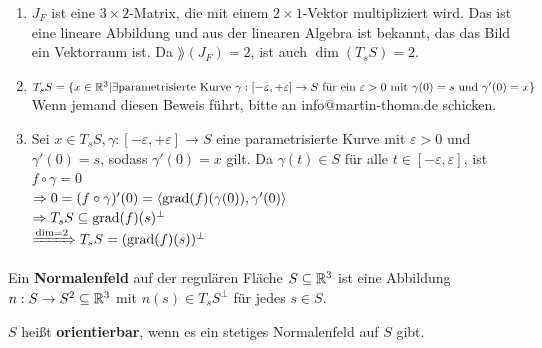 \begin{beweis}\leavevmode
    \begin{enumerate}[label=\alph*)]
        \item $J_F$ ist eine $3 \times 2$-Matrix, die mit einem $2 \times 1$-Vektor
              multipliziert wird. Das ist eine lineare Abbildung und aus der 
              linearen Algebra ist bekannt, das das Bild ein Vektorraum ist.
              Da $\rang(J_F) = 2$, ist auch $\dim (T_s S) = 2$.
        \item $T_s S = \{x \in \mathbb{R}^3 | \exists \text{parametrisierte Kurve } 
          \gamma:[- \varepsilon, + \varepsilon] \rightarrow S 
          \text{ für ein } \varepsilon > 0 
          \text{ mit } \gamma(0) = s \text{ und } \gamma'(0) = x
          \}$\\
          Wenn jemand diesen Beweis führt, bitte an info@martin-thoma.de 
          schicken.%
        \item Sei $x \in T_s S, \gamma:[-\varepsilon, +\varepsilon] \rightarrow S$
    eine parametrisierte Kurve mit $\varepsilon > 0$ und $\gamma'(0) = s$,
    sodass $\gamma'(0) = x$ gilt. Da $\gamma(t) \in S$ für alle
    $t \in [-\varepsilon, \varepsilon]$, ist $f \circ \gamma = 0$\\
    $\Rightarrow 0 = (f \circ \gamma)'(0) = \langle \operatorname{grad}(f)(\gamma(0)), \gamma'(0) \rangle$\\
    $\Rightarrow T_s S \subseteq \operatorname{grad} (f)(s)^\perp$\\
    $\xRightarrow{\dim = 2} T_s S = (\operatorname{grad}(f)(s))^\perp$
    \end{enumerate}
\end{beweis}

\begin{definition}%
    \begin{defenum}
        \item Ein \textbf{Normalenfeld} auf der regulären
              Fläche $S \subseteq \mathbb{R}^3$ ist eine Abbildung $n: S \rightarrow S^2 \subseteq \mathbb{R}^3$
              mit $n(s) \in T_s S^\perp$ für jedes $s \in S$.
        \item $S$ heißt \textbf{orientierbar},
              wenn es ein stetiges Normalenfeld auf $S$ gibt.
    \end{defenum}
\end{definition}

